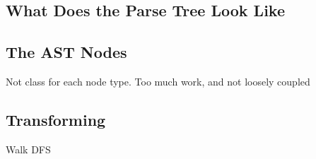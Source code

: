 
\subsection{What Does the Parse Tree Look Like}\label{subsec:what-does-the-parse-tree-look-like}

\subsection{The AST Nodes}\label{subsec:the-ast-nodes}

Not class for each node type.
    Too much work, and not loosely coupled

\subsection{Transforming}\label{subsec:transforming}

Walk DFS